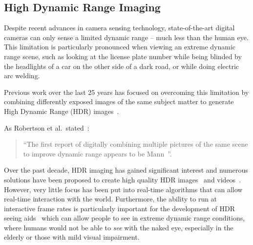 \subsection{High Dynamic Range Imaging}
Despite recent advances in camera sensing technology, state-of-the-art digital cameras can only 
sense a limited dynamic range -- much less than the human eye. This limitation is particularly 
pronounced when viewing an extreme dynamic range scene, such as looking at the license plate 
number while being blinded by the headlights of a car on the other side of a dark road, or while doing 
electric arc welding.

Previous work over the last 25 years has focused on overcoming this limitation by combining 
differently exposed images of the same subject matter to generate High Dynamic Range (HDR) 
images~\cite{mannist}. 

As  Robertson et al.\ stated~\cite{robertson2003estimation}:
\begin{quote}
  ``The first report of digitally combining multiple pictures of the
  same scene to improve dynamic range appears to be
  Mann~\cite{mannist}''.
\end{quote} 

Over the past decade, HDR imaging has gained significant interest and numerous solutions have 
been proposed to create high quality HDR 
images~\cite{mannist,comparam,robertson2003estimation,debevec2008recovering}
and videos~\cite{kang2003high,ali2012ICASSP,irawan2005perceptually, HDRVideoCamera11}.
However, very little focus has been put into real-time algorithms that can
allow real-time interaction with the world.  Furthermore, the ability to run
at interactive frame rates is particularly important for the development of
HDR seeing aids~\cite{mann2004continuous} which can allow people to see in
extreme dynamic range conditions, where humans would not be able to {\em see}
with the naked eye, especially in the elderly or those with mild visual impairment.

